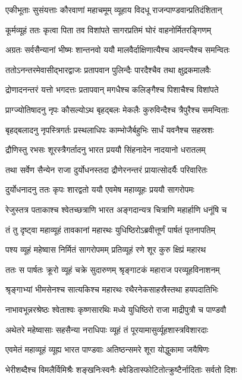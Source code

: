 \twolineshloka
{एकीभूताः सुसंयत्ताः कौरवाणां महाचमूम्}
{व्यूहाय विदधू राजन्पाण्डवान्प्रतिदंशितान्}


\twolineshloka
{कूर्मव्यूहं ततः कृत्वा पिता तव विशांपते}
{सागरप्रतिमं घोरं वाहनोर्मितरङ्गिणम्}


\twolineshloka
{अग्रतः सर्वसैन्यानां भीष्मः शान्तनवो ययौ}
{मालवैर्दाक्षिणात्यैश्च आवन्त्यैश्च समन्वितः}


\twolineshloka
{ततोऽनन्तरमेवासीद्भारद्वाजः प्रतापवान}
{पुलिन्दैः पारदैश्चैव तथा क्षुद्रकमालवैः}


\twolineshloka
{द्रोणादनन्तरं यत्तो भगदत्तः प्रतापवान्}
{मगधैश्च कलिङ्गैश्च पिशाचैश्च विशांपते}


\twolineshloka
{प्राग्ज्योतिषादनु नृपः कौसल्योऽथ बृहद्बलः}
{मेकलैः कुरुविन्दैश्च त्रैपुरैश्च समन्विताः}


\twolineshloka
{बृहद्बलादनु नृपस्त्रिगर्तः प्रस्थलाधिपः}
{काम्भोजैर्बहुभिः सार्धं यवनैश्च सहस्रशः}


\twolineshloka
{द्रौणिस्तु रभसः शूरस्त्रैगर्तादनु भारत}
{प्रययौ सिंहनादेन नादयानो धरातलम्}


\twolineshloka
{तथा सर्वेण सैन्येन राजा दुर्योधनस्तदा}
{द्रौणेरनन्तरं प्रायात्सोदर्यैः परिवारितः}


\twolineshloka
{दुर्योधनादनु ततः कृपः शारद्वतो ययौ}
{एवमेष महाव्यूहः प्रययौ सागरोपमः}


\twolineshloka
{रेजुस्तत्र पताकाश्च श्वेतच्छत्राणि भारत}
{अङ्गदान्यत्र चित्राणि महार्हाणि धनूंषि च}


\twolineshloka
{तं तु दृष्ट्वा महाव्यूहं तावकानां महारथः}
{युधिष्ठिरोऽब्रवीत्तूर्णं पार्षतं पृतनापतिम्}


\twolineshloka
{पश्य व्यूहं महेष्वास निर्मितं सागरोपमम्}
{प्रतिव्यूहं रणे शूर कुरु क्षिप्रं महारथ}


\twolineshloka
{ततः स पार्षतः क्रूरो व्यूहं चक्रे सुदारुणम्}
{श्रृङ्गाटकं महाराज परव्यूहविनाशनम्}


\twolineshloka
{श्रृङ्गाभ्यां भीमसेनश्च सात्यकिश्च महारथः}
{रथैरनेकसाहस्रैस्तथा हयपदातिभिः}


\twolineshloka
{नाभावभून्नरश्रेष्ठः श्वेताश्वः कृष्णसारथिः}
{मध्ये युधिष्ठिरो राजा माद्रीपुत्रौ च पाण्डवौ}


\twolineshloka
{अथेतरे महेष्वासाः सहसैन्या नराधिपाः}
{व्यूहं तं पूरयामासुर्व्यूहशास्त्रविशारदाः}


\twolineshloka
{एवमेतं महाव्यूहं व्यूह्य भारत पाण्डवाः}
{अतिष्ठन्समरे शूरा योद्धुकामा जयैषिणः}


\twolineshloka
{भेरीशब्दैश्च विमलैर्विमिश्रैः शङ्खनिःस्वनैः}
{क्ष्वेडितास्फोटितोत्क्रुष्टैर्नादिताः सर्वतो दिशः}


